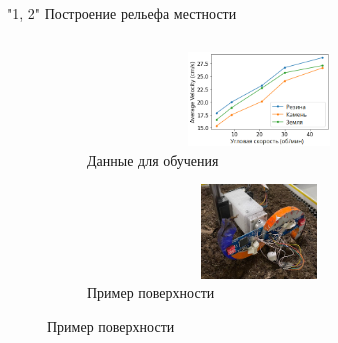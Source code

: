 \begin{frame}[t]{"1, 2" Построение рельефа местности}
\begin{columns}[T,onlytextwidth]
\begin{column}{0.49\textwidth}
            \vspace{-0.35cm}
            \begin{figure}[H]
                \begin{subfigure}[t]{0.49\textwidth}
                    \centering\includegraphics[height=2.5cm,width=1\textwidth,keepaspectratio]{../images/slides/avg_lin_vel_rev_min.png}
                    \caption*{Данные для обучения}
                \end{subfigure}
                \begin{subfigure}[t]{0.49\textwidth}
                    \centering\includegraphics[height=2.5cm,width=1\textwidth,keepaspectratio]{../images/slides/data.png}
                    \caption*{Пример поверхности}
                \end{subfigure}
            \end{figure}
        \end{column}
    \end{columns}
\end{frame}

